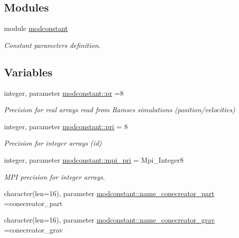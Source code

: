 \subsection*{Modules}
\begin{DoxyCompactItemize}
\item 
module \hyperlink{namespacemodconstant}{modconstant}
\begin{DoxyCompactList}\small\item\em Constant parameters definition. \end{DoxyCompactList}\end{DoxyCompactItemize}
\subsection*{Variables}
\begin{DoxyCompactItemize}
\item 
integer, parameter \hyperlink{namespacemodconstant_a54966a555666da051c8c851545e11ff7}{modconstant\+::pr} =8
\begin{DoxyCompactList}\small\item\em Precision for real arrays read from Ramses simulations (position/velocities) \end{DoxyCompactList}\item 
integer, parameter \hyperlink{namespacemodconstant_a3463d55217ae4b194f21c061a619c48e}{modconstant\+::pri} = 8
\begin{DoxyCompactList}\small\item\em Precision for integer arrays (id) \end{DoxyCompactList}\item 
integer, parameter \hyperlink{namespacemodconstant_a4c7b1b69a38bfb69c932e4a770dae783}{modconstant\+::mpi\+\_\+pri} = Mpi\+\_\+\+Integer8
\begin{DoxyCompactList}\small\item\em M\+PI precision for integer arrays. \end{DoxyCompactList}\item 
character(len=16), parameter \hyperlink{namespacemodconstant_a6afcef14340a8cd5b8736b89385ab062}{modconstant\+::name\+\_\+conecreator\+\_\+part} =\textquotesingle{}conecreator\+\_\+part\textquotesingle{}
\item 
character(len=16), parameter \hyperlink{namespacemodconstant_ad761f8ece8de325d4dc3d9cb425fedc5}{modconstant\+::name\+\_\+conecreator\+\_\+grav} =\textquotesingle{}conecreator\+\_\+grav\textquotesingle{}
\item 

\end{DoxyCompactItemize}
